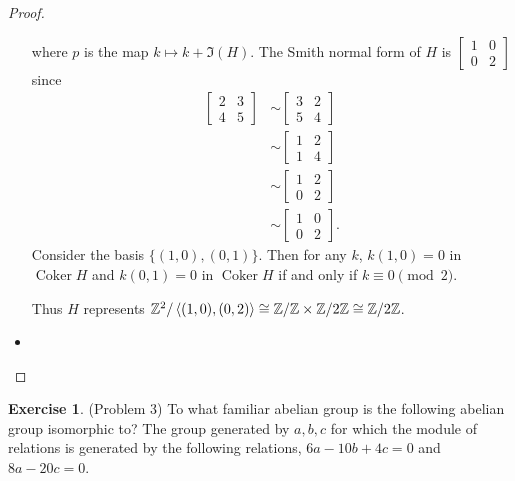 \documentclass[12pt, psamsfonts]{amsart}
\theoremstyle{definition}
\newtheorem*{exer}{Exercise}
\theoremstyle{remark}
\DeclareMathOperator{\Coker}{Coker}
\numberwithin{equation}{section}
\begin{document}
\begin{proof}
\begin{itemize}
      where $p$ is the map $k \mapsto k + \Im(H)$.
      The Smith normal form of $H$ is $\begin{bmatrix} 1 & 0 \\ 0 & 2 \end{bmatrix}$ since
      \begin{align*}
        \begin{bmatrix} 2 & 3 \\ 4 & 5 \end{bmatrix}
          &\sim \begin{bmatrix} 3 & 2 \\ 5 & 4 \end{bmatrix} \\
          &\sim \begin{bmatrix} 1 & 2 \\ 1 & 4 \end{bmatrix} \\
          &\sim \begin{bmatrix} 1 & 2 \\ 0 & 2 \end{bmatrix} \\
          &\sim \begin{bmatrix} 1 & 0 \\ 0 & 2 \end{bmatrix}.
      \end{align*}
      Consider the basis $\{ (1, 0), (0, 1) \}$.
      Then for any $k$, $k(1, 0) = 0$ in $\Coker{H}$ and $k(0, 1) = 0$ in $\Coker{H}$ if and only if $k \equiv 0 \pmod 2$.

      Thus $H$ represents $\mathbb{Z}^2/\ev{(1, 0), (0, 2)} \cong \mathbb{Z}/\mathbb{Z} \times \mathbb{Z}/2\mathbb{Z} \cong \mathbb{Z}/2\mathbb{Z}$.

    \item
      \todo[inline,caption={}]{
      }
  \end{itemize}
\end{proof}

\begin{exer}{(Problem 3)}
  To what familiar abelian group is the following abelian group isomorphic to?
  The group generated by $a, b, c$ for which the module of relations is generated by the following relations, $6a - 10b + 4c = 0$ and $8a - 20c = 0$.
\end{exer}
\end{document}
